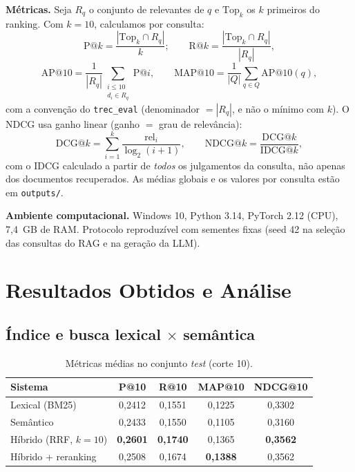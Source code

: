 \documentclass[9pt,a4paper,twocolumn]{article}
\newcommand{\bmk}{\textsc{BM25}}
\newcommand{\rrf}{\textsc{RRF}}
\newcommand{\ndcg}{\textsc{NDCG}}
\begin{document}
\textbf{Métricas.} Seja $R_q$ o conjunto de relevantes de $q$ e $\mathrm{Top}_k$ os $k$ primeiros
do ranking. Com $k=10$, calculamos por consulta:
\[
\mathrm{P@}k=\frac{|\mathrm{Top}_k\cap R_q|}{k};\qquad
\mathrm{R@}k=\frac{|\mathrm{Top}_k\cap R_q|}{|R_q|},
\]
\[
\mathrm{AP@}10=\frac{1}{|R_q|}\sum_{\substack{i\le 10\\ d_i\in R_q}}\mathrm{P@}i,\qquad
\mathrm{MAP@}10=\frac{1}{|Q|}\sum_{q\in Q}\mathrm{AP@}10(q),
\]
com a convenção do \texttt{trec\_eval} (denominador $=|R_q|$, e não o mínimo com $k$). O \ndcg{}
usa ganho linear (ganho $=$ grau de relevância):
\[
\mathrm{DCG@}k=\sum_{i=1}^{k}\frac{\mathrm{rel}_i}{\log_2(i+1)},\qquad
\mathrm{NDCG@}k=\frac{\mathrm{DCG@}k}{\mathrm{IDCG@}k},
\]
com o $\mathrm{IDCG}$ calculado a partir de \emph{todos} os julgamentos da consulta, não apenas
dos documentos recuperados. As médias globais e os valores por consulta estão em
\texttt{outputs/}.

\textbf{Ambiente computacional.} Windows 10, Python 3.14, PyTorch 2.12 (CPU), 7,4~GB de RAM.
Protocolo reproduzível com sementes fixas (seed 42 na seleção das consultas do RAG e na
geração da LLM).

\section{Resultados Obtidos e Análise}

\subsection{Índice e busca lexical $\times$ semântica}

\begin{table}[h]
\centering
\small
\begin{tabular}{lcccc}
\toprule
Sistema & P@10 & R@10 & MAP@10 & NDCG@10\\
\midrule
Lexical (\bmk{}) & 0{,}2412 & 0{,}1551 & 0{,}1225 & 0{,}3302\\
Semântico & 0{,}2433 & 0{,}1550 & 0{,}1105 & 0{,}3160\\
Híbrido (\rrf{}, $k{=}10$) & \textbf{0{,}2601} & \textbf{0{,}1740} & 0{,}1365 & \textbf{0{,}3562}\\
Híbrido + reranking & 0{,}2508 & 0{,}1674 & \textbf{0{,}1388} & 0{,}3562\\
\bottomrule
\end{tabular}
\caption{Métricas médias no conjunto \emph{test} (corte 10).}
\label{tab:metricas}
\end{table}
\end{document}
